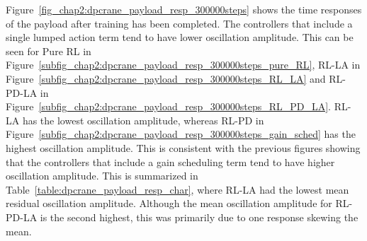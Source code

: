 Figure~\ref{fig_chap2:dpcrane_payload_resp_300000steps} shows the time responses of the payload after training has been completed. The controllers that include a single lumped action term tend to have lower oscillation amplitude. This can be seen for Pure RL in Figure~\ref{subfig_chap2:dpcrane_payload_resp_300000steps_pure_RL}, RL-LA in Figure~\ref{subfig_chap2:dpcrane_payload_resp_300000steps_RL_LA} and RL-PD-LA in Figure~\ref{subfig_chap2:dpcrane_payload_resp_300000steps_RL_PD_LA}. RL-LA has the lowest oscillation amplitude, whereas RL-PD in Figure~\ref{subfig_chap2:dpcrane_payload_resp_300000steps_gain_sched} has the highest oscillation amplitude. This is consistent with the previous figures showing that the controllers that include a gain scheduling term tend to have higher oscillation amplitude. This is summarized in Table~\ref{table:dpcrane_payload_resp_char}, where RL-LA had the lowest mean residual oscillation amplitude. Although the mean oscillation amplitude for RL-PD-LA is the second highest, this was primarily due to one response skewing the mean.
%

